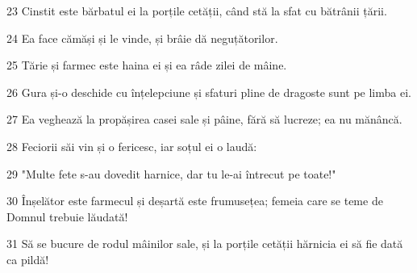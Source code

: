 \par 23 Cinstit este bărbatul ei la porțile cetății, când stă la sfat cu bătrânii țării.
\par 24 Ea face cămăși și le vinde, și brâie dă neguțătorilor.
\par 25 Tărie și farmec este haina ei și ea râde zilei de mâine.
\par 26 Gura și-o deschide cu înțelepciune și sfaturi pline de dragoste sunt pe limba ei.
\par 27 Ea veghează la propășirea casei sale și pâine, fără să lucreze; ea nu mănâncă.
\par 28 Feciorii săi vin și o fericesc, iar soțul ei o laudă:
\par 29 "Multe fete s-au dovedit harnice, dar tu le-ai întrecut pe toate!"
\par 30 Înșelător este farmecul și deșartă este frumusețea; femeia care se teme de Domnul trebuie lăudată!
\par 31 Să se bucure de rodul mâinilor sale, și la porțile cetății hărnicia ei să fie dată ca pildă!


